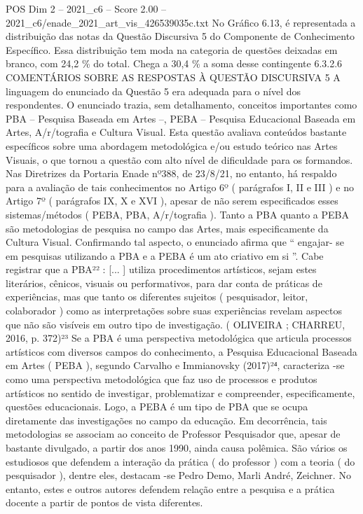 \begin{textsample}{POS Dim 2 – 2021\_c6 – Score 2.00 – 2021\_c6/enade\_2021\_art\_vis\_426539035c.txt}
No Gráfico 6.13, é representada a distribuição das notas da Questão Discursiva 5 do Componente de Conhecimento Específico.
Essa distribuição tem moda na categoria de questões deixadas em branco, com 24,2 \% do total.
Chega a 30,4 \% a soma desse contingente 6.3.2.6 COMENTÁRIOS SOBRE AS RESPOSTAS À QUESTÃO DISCURSIVA 5 A linguagem do enunciado da Questão 5 era adequada para o nível dos respondentes.
O enunciado trazia, sem detalhamento, conceitos importantes como PBA – Pesquisa Baseada em Artes –, PEBA – Pesquisa Educacional Baseada em Artes, A/r/tografia e Cultura Visual.
Esta questão avaliava conteúdos bastante específicos sobre uma abordagem metodológica e/ou estudo teórico nas Artes Visuais, o que tornou a questão com alto nível de dificuldade para os formandos.
Nas Diretrizes da Portaria Enade nº388, de 23/8/21, no entanto, há respaldo para a avaliação de tais conhecimentos no Artigo 6º ( parágrafos I, II e III ) e no Artigo 7º ( parágrafos IX, X e XVI ), apesar de não serem especificados esses sistemas/métodos ( PEBA, PBA, A/r/tografia ).
Tanto a PBA quanto a PEBA são metodologias de pesquisa no campo das Artes, mais especificamente da Cultura Visual.
Confirmando tal aspecto, o enunciado afirma que “ engajar- se em pesquisas utilizando a PBA e a PEBA é um ato criativo em si ”.
Cabe registrar que a PBA²² : [... ] utiliza procedimentos artísticos, sejam estes literários, cênicos, visuais ou performativos, para dar conta de práticas de experiências, mas que tanto os diferentes sujeitos ( pesquisador, leitor, colaborador ) como as interpretações sobre suas experiências revelam aspectos que não são visíveis em outro tipo de investigação. ( OLIVEIRA ; CHARREU, 2016, p. 372)²³ Se a PBA é uma perspectiva metodológica que articula processos artísticos com diversos campos do conhecimento, a Pesquisa Educacional Baseada em Artes ( PEBA ), segundo Carvalho e Immianovsky (2017)²⁴, caracteriza -se como uma perspectiva metodológica que faz uso de processos e produtos artísticos no sentido de investigar, problematizar e compreender, especificamente, questões educacionais.
Logo, a PEBA é um tipo de PBA que se ocupa diretamente das investigações no campo da educação.
Em decorrência, tais metodologias se associam ao conceito de Professor Pesquisador que, apesar de bastante divulgado, a partir dos anos 1990, ainda causa polêmica.
São vários os estudiosos que defendem a interação da prática ( do professor ) com a teoria ( do pesquisador ), dentre eles, destacam -se Pedro Demo, Marli André, Zeichner.
No entanto, estes e outros autores defendem relação entre a pesquisa e a prática docente a partir de pontos de vista diferentes.

\end{textsample}
